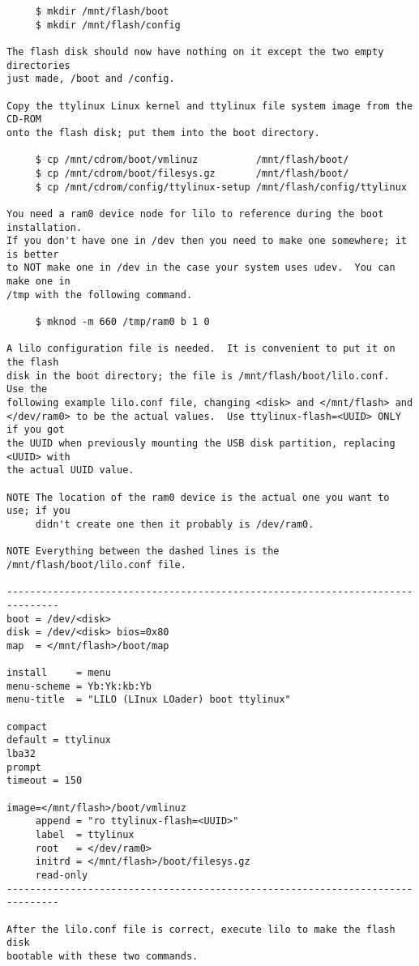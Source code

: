 \documentclass[10pt]{article}
\begin{document}
\begin{lstlisting}
     $ mkdir /mnt/flash/boot
     $ mkdir /mnt/flash/config

The flash disk should now have nothing on it except the two empty directories
just made, /boot and /config.

Copy the ttylinux Linux kernel and ttylinux file system image from the CD-ROM
onto the flash disk; put them into the boot directory.

     $ cp /mnt/cdrom/boot/vmlinuz          /mnt/flash/boot/
     $ cp /mnt/cdrom/boot/filesys.gz       /mnt/flash/boot/
     $ cp /mnt/cdrom/config/ttylinux-setup /mnt/flash/config/ttylinux

You need a ram0 device node for lilo to reference during the boot installation.
If you don't have one in /dev then you need to make one somewhere; it is better
to NOT make one in /dev in the case your system uses udev.  You can make one in
/tmp with the following command.

     $ mknod -m 660 /tmp/ram0 b 1 0

A lilo configuration file is needed.  It is convenient to put it on the flash
disk in the boot directory; the file is /mnt/flash/boot/lilo.conf.  Use the
following example lilo.conf file, changing <disk> and </mnt/flash> and
</dev/ram0> to be the actual values.  Use ttylinux-flash=<UUID> ONLY if you got
the UUID when previously mounting the USB disk partition, replacing <UUID> with
the actual UUID value.

NOTE The location of the ram0 device is the actual one you want to use; if you
     didn't create one then it probably is /dev/ram0.

NOTE Everything between the dashed lines is the /mnt/flash/boot/lilo.conf file.

-------------------------------------------------------------------------------
boot = /dev/<disk>
disk = /dev/<disk> bios=0x80
map  = </mnt/flash>/boot/map

install     = menu
menu-scheme = Yb:Yk:kb:Yb
menu-title  = "LILO (LInux LOader) boot ttylinux"

compact
default = ttylinux
lba32
prompt
timeout = 150

image=</mnt/flash>/boot/vmlinuz
     append = "ro ttylinux-flash=<UUID>"
     label  = ttylinux
     root   = </dev/ram0>
     initrd = </mnt/flash>/boot/filesys.gz
     read-only
-------------------------------------------------------------------------------

After the lilo.conf file is correct, execute lilo to make the flash disk
bootable with these two commands.


\end{lstlisting}
\end{document}
